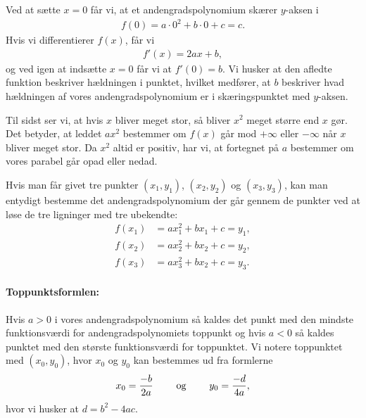 Ved at sætte $x=0$ får vi, at et andengradspolynomium skærer $y$-aksen i
\begin{align*}
f(0)=a\cdot 0^2 + b \cdot 0 + c = c.
\end{align*}
Hvis vi differentierer $f(x)$, får vi
\begin{align*}
f'(x)=2ax+b,
\end{align*}
og ved igen at indsætte $x=0$ får vi at $f'(0)=b$. Vi husker at den afledte funktion beskriver hældningen i punktet, hvilket medfører, at $b$ beskriver hvad hældningen af vores andengradspolynomium er i skæringspunktet med $y$-aksen.

Til sidst ser vi, at hvis $x$ bliver meget stor, så bliver $x^2$ meget større end $x$ gør. Det betyder, at leddet $ax^2$ bestemmer om $f(x)$ går mod $+ \infty$ eller $-\infty$ når $x$ bliver meget stor. Da $x^2$ altid er positiv, har vi, at fortegnet på $a$ bestemmer om vores parabel går opad eller nedad. 

Hvis man får givet tre punkter $(x_1,y_1)$, $(x_2,y_2)$ og $(x_3,y_3)$, kan man entydigt bestemme det andengradspolynomium der går gennem de punkter ved at løse de tre ligninger med tre ubekendte:
\begin{align*}
f(x_1)&=ax_1^2+bx_1+c = y_1, \\
f(x_2)&=ax_2^2+bx_2+c = y_2, \\
f(x_3)&=ax_3^2+bx_2+c = y_3.
\end{align*}

\paragraph*{Toppunktsformlen:}
Hvis $a > 0$ i vores andengradspolynomium så kaldes det punkt med den mindste funktionsværdi for andengradspolynomiets toppunkt og hvis $a < 0$ så kaldes punktet med den største funktionsværdi for toppunktet. Vi notere toppunktet med $(x_0,y_0)$, hvor $x_0$ og $y_0$ kan bestemmes ud fra formlerne
\begin{align*}
x_0 = \frac{-b}{2a} \qquad \textup{ og } \qquad y_0=\frac{-d}{4a},
\end{align*}
hvor vi husker at $d=b^2-4ac$.



